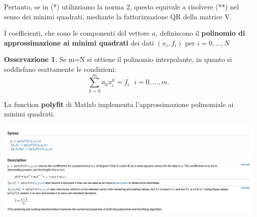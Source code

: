 \documentclass[11pt]{article}
\theoremstyle{definition}
\newtheorem{oss}{Osservazione}
\theoremstyle{plain}
\begin{document}
Pertanto, se in (*) utilizziamo la norma 2, questo equivale a risolvere (**) nel senso dei minimi quadrati, mediante la fattorizzazione QR della matrice V. 

	I coefficienti, che sono le componenti del vettore $a$, definiscono il \textbf{polinomio di approssimazione ai minimi quadrati} dei dati $(x_{i},f_{i})$ per $i=0,...,N$ 

	\begin{oss}
		Se m=N si ottiene il polinomio interpolante, in quanto si soddisfano esattamente le condizioni:
		\[
		\sum_{k=0}^{m} a_kx_{i}^{k}=f_{i}\ \ \ i=0,...,m
		.\] 
	\end{oss}

La function \textbf{polyfit} di Matlab implementa l'approssimazione polinomiale ai minimi quadrati.

\includegraphics[width=\textwidth]{polyfit}
\end{document}
